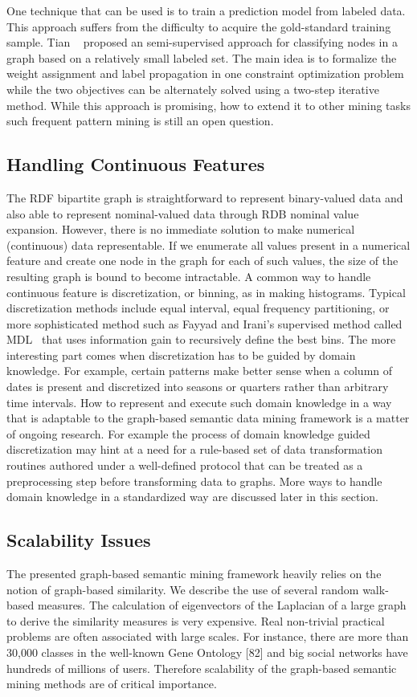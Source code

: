 One technique that can be used is to train a prediction model from labeled data. This approach suffers from the difficulty to acquire the gold-standard training sample. Tian \etal~\cite{Tian2009AHyper} proposed an semi-supervised approach for classifying nodes in a graph based on a relatively small labeled set. The main idea is to formalize the weight assignment and label propagation in one constraint optimization problem while the two objectives can be alternately solved using a two-step iterative method. While this approach is promising, how to extend it to other mining tasks such frequent pattern mining is still an open question.

\subsection{Handling Continuous Features}
The RDF bipartite graph is straightforward to represent binary-valued data and also able to represent nominal-valued data through RDB nominal value expansion. However, there is no immediate solution to make numerical (continuous) data representable. If we enumerate all values present in a numerical feature and create one node in the graph for each of such values, the size of the resulting graph is bound to become intractable. A common way to handle continuous feature is discretization, or binning, as in making histograms. Typical discretization methods include equal interval, equal frequency partitioning, or more sophisticated method such as Fayyad and Irani's supervised method called MDL~\cite{FayyadI93discretization} that uses information gain to recursively define the best bins. The more interesting part comes when discretization has to be guided by domain knowledge. For example, certain patterns make better sense when a column of dates is present and discretized into seasons or quarters rather than arbitrary time intervals. How to represent and execute such domain knowledge in a way that is adaptable to the graph-based semantic data mining framework is a matter of ongoing research. For example the process of domain knowledge guided discretization may hint at a need for a rule-based set of data transformation routines authored under a well-defined protocol that can be treated as a preprocessing step before transforming data to graphs. More ways to handle domain knowledge in a standardized way are discussed later in this section.

\subsection{Scalability Issues}
The presented graph-based semantic mining framework heavily relies on the notion of graph-based similarity. We describe the use of several random walk-based measures. The calculation of eigenvectors of the Laplacian of a large graph to derive the similarity measures is very expensive. Real non-trivial practical problems are often associated with large scales. For instance, there are
more than 30,000 classes in the well-known Gene Ontology [82] and big social networks have hundreds of millions of users. Therefore scalability of the graph-based semantic mining methods are of critical importance.

